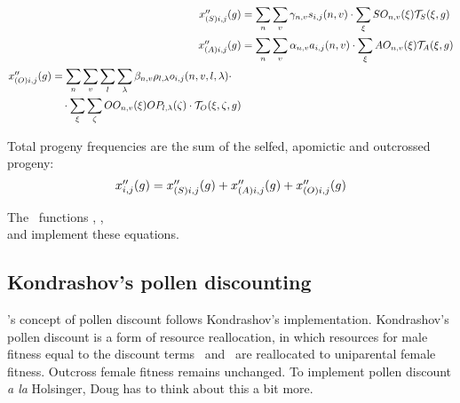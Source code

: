 \begin{align}
\label{eq:kondrashov:xppsijg}
\mbox{$x''_{(S)i,j}(g)$} &= 
\sum_{n}{
							\sum_{v}{
								\mbox{$\gamma_{n,v}$} \mbox{$s_{i,j}(n,v)$} \cdot
									\sum_{\xi}{
										\mbox{$SO_{n,v}(\xi)$} \mbox{${\cal T}_{S}(\xi,g)$}
									}
						}}
    \\
\label{eq:kondrashov:xppaijg}
\mbox{$x''_{(A)i,j}(g)$} &= \sum_{n}{
							\sum_{v}{
								\mbox{$\alpha_{n,v}$} \mbox{$a_{i,j}(n,v)$} \cdot
									\sum_{\xi}{
										\mbox{$AO_{n,v}(\xi)$} \mbox{${\cal T}_{A}(\xi,g)$}
									}
						}}
    \\
\begin{split}
\label{eq:kondrashov:xppoijg}
\mbox{$x''_{(O)i,j}(g)$} &= \sum_{n}{
							\sum_{v}{
								\sum_{l}{
									\sum_{\lambda}{
										\mbox{$\beta_{n,v}$} \mbox{$\rho_{l,\lambda}$} \mbox{$o_{i,j}(n,v,l,\lambda)$} 
						}}}} \cdot \\
				&\quad \cdot	\sum_{\xi}{
												\sum_{\zeta}{
													\mbox{$OO_{n,v}(\xi)$} \mbox{$OP_{l,\lambda}(\zeta)$} \cdot \mbox{${\cal T}_{O}(\xi,\zeta,g)$}
											}}
\end{split}
\end{align}

Total progeny frequencies are the sum of the selfed, apomictic and outcrossed progeny:
\begin{equation}
\mbox{$x''_{i,j}(g)$} = \mbox{$x''_{(S)i,j}(g)$} + \mbox{$x''_{(A)i,j}(g)$} + \mbox{$x''_{(O)i,j}(g)$}
\end{equation}

The \K\ functions , 
, \\
 and  implement these equations.

\subsection{Kondrashov's pollen discounting}

\K's concept of pollen discount follows Kondrashov's implementation.  Kondrashov's pollen discount is a form of resource reallocation, in which resources for male fitness equal to the discount terms \DSg\Sg\ and \DAg\Ag\ are reallocated to uniparental female fitness.  Outcross female fitness remains unchanged.  To implement pollen discount {\it a la} Holsinger, Doug has to think about this a bit more.

